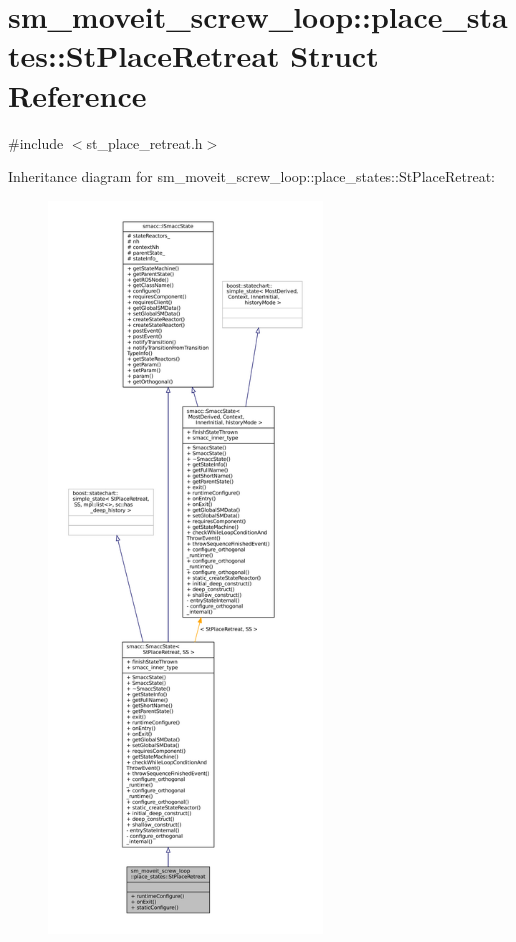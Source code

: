 \hypertarget{structsm__moveit__screw__loop_1_1place__states_1_1StPlaceRetreat}{}\section{sm\+\_\+moveit\+\_\+screw\+\_\+loop\+:\+:place\+\_\+states\+:\+:St\+Place\+Retreat Struct Reference}
\label{structsm__moveit__screw__loop_1_1place__states_1_1StPlaceRetreat}


{\ttfamily \#include $<$st\+\_\+place\+\_\+retreat.\+h$>$}



Inheritance diagram for sm\+\_\+moveit\+\_\+screw\+\_\+loop\+:\+:place\+\_\+states\+:\+:St\+Place\+Retreat\+:
\nopagebreak
\begin{figure}[H]
\begin{center}
\leavevmode
\includegraphics[height=550pt]{structsm__moveit__screw__loop_1_1place__states_1_1StPlaceRetreat__inherit__graph}
\end{center}
\end{figure}


